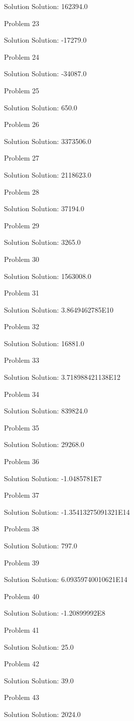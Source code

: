 \documentclass{article}
\begin{document}
Solution Solution: 162394.0

Problem 23

Solution Solution: -17279.0

Problem 24

Solution Solution: -34087.0

Problem 25

Solution Solution: 650.0

Problem 26

Solution Solution: 3373506.0

Problem 27

Solution Solution: 2118623.0

Problem 28

Solution Solution: 37194.0

Problem 29

Solution Solution: 3265.0

Problem 30

Solution Solution: 1563008.0

Problem 31

Solution Solution: 3.8649462785E10

Problem 32

Solution Solution: 16881.0

Problem 33

Solution Solution: 3.718988421138E12

Problem 34

Solution Solution: 839824.0

Problem 35

Solution Solution: 29268.0

Problem 36

Solution Solution: -1.0485781E7

Problem 37

Solution Solution: -1.35413275091321E14

Problem 38

Solution Solution: 797.0

Problem 39

Solution Solution: 6.09359740010621E14

Problem 40

Solution Solution: -1.20899992E8

Problem 41

Solution Solution: 25.0

Problem 42

Solution Solution: 39.0

Problem 43

Solution Solution: 2024.0
\end{document}

